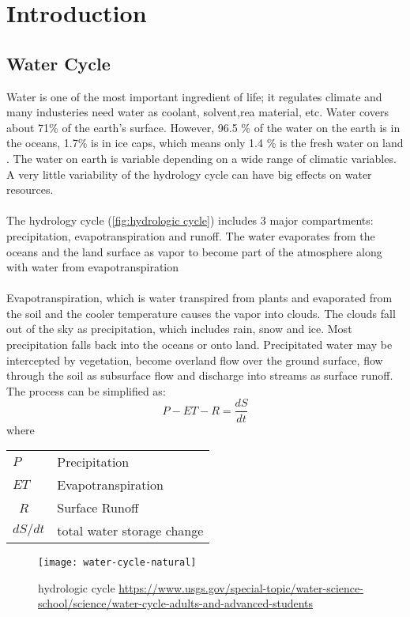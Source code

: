 \chapter{Introduction}
\section{Water Cycle}
Water is one of the most important ingredient of life; it regulates climate and many industeries need water as coolant, solvent,rea material, etc. Water covers about 71\% of the earth's surface. However, 96.5 \% of the water on the earth is in the oceans, 1.7\% is in ice caps, which means only 1.4 \% is the fresh water on land \cite{gleick1993water}. The water on earth is variable depending on a wide range of climatic variables. A very little variability of the hydrology cycle can have big effects on water resources. \cite{evans1996effects}\\\\
The hydrology cycle (\autoref{fig:hydrologic cycle}) includes 3 major compartments: precipitation, evapotranspiration and runoff. The water evaporates from the oceans and the land surface as vapor to become part of the atmosphere along with water from evapotranspiration\\\\
Evapotranspiration, which is water transpired from plants and evaporated from the soil and the cooler temperature causes the vapor into clouds. The clouds fall out of the sky as precipitation, which includes rain, snow and ice. Most precipitation falls back into the oceans or onto land. Precipitated water may be intercepted by vegetation, become overland flow over the ground surface, flow through the soil as subsurface flow and discharge into streams as surface runoff. The process can be simplified as:
\begin{equation}\label{equa:waterbalence}
	 P - ET - R = \frac{dS}{dt}
\end{equation}
where
\begin{table}[htbp]
	\begin{tabular}{ll}
		$P$   & Precipitation    \\ 
		$ET$    & Evapotranspiration \\ \
		$R$     & Surface Runoff \\ 
		$dS / dt$ & total water storage change \\ 
	\end{tabular}
\end{table}
\begin{figure}[htbp]
	\centering
	\texttt{[image: water-cycle-natural]} %
	\caption{hydrologic cycle \url{https://www.usgs.gov/special-topic/water-science-school/science/water-cycle-adults-and-advanced-students}} 
	\label{fig:hydrologic cycle}
\end{figure}
